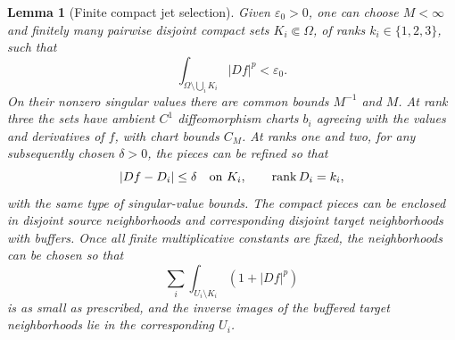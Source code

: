 \documentclass[11pt]{article}
\numberwithin{equation}{section}
\newtheorem{lemma}[theorem]{Lemma}
\theoremstyle{definition}
\theoremstyle{remark}
\begin{document}
\begin{lemma}[Finite compact jet selection]\label{la:jet-selection}
Given $\varepsilon_0>0$, one can choose $M<\infty$ and finitely many
pairwise disjoint compact sets $K_i\Subset\Omega$, of ranks
$k_i\in\{1,2,3\}$, such that
\begin{equation}\label{la:jet-tail}
 \int_{\Omega\setminus\bigcup_iK_i}|Df|^p<\varepsilon_0.
\end{equation}
On their nonzero singular values there are common bounds $M^{-1}$
and $M$.  At rank three the sets have ambient $C^1$ diffeomorphism
charts $b_i$ agreeing with the values and derivatives of $f$, with
chart bounds $C_M$.  At ranks one and two, for any subsequently chosen
$\delta>0$, the pieces can be refined so that
\begin{equation}\label{la:rank-model}
 |Df-D_i|\le\delta\quad\hbox{on }K_i,
 \qquad \operatorname{rank} D_i=k_i,
\end{equation}
with the same type of singular-value bounds.  The compact pieces can
be enclosed in disjoint source neighborhoods and corresponding
disjoint target neighborhoods with buffers.  Once all finite
multiplicative constants are fixed, the neighborhoods can be chosen
so that
\begin{equation}\label{la:excess-neighborhood}
 \sum_i\int_{U_i\setminus K_i}(1+|Df|^p)
\end{equation}
is as small as prescribed, and the inverse images of the buffered
target neighborhoods lie in the corresponding $U_i$.
\end{lemma}
\end{document}

